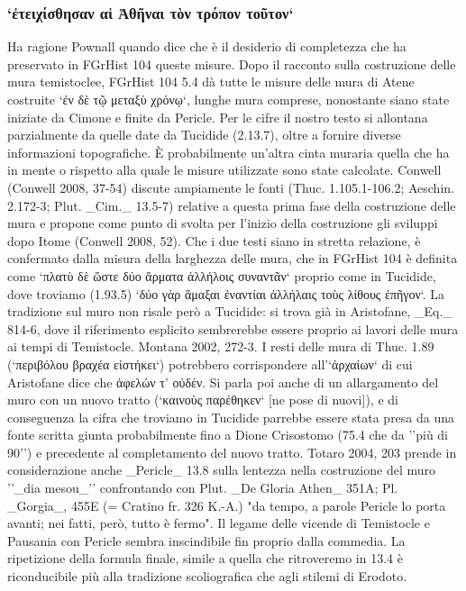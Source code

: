             \subsubsection{`ἐτειχίσθησαν αἱ Ἀθῆναι τὸν τρόπον τοῦτον`}
            Ha ragione Pownall quando dice che è il desiderio di completezza che ha preservato in FGrHist 104  queste misure. Dopo il racconto sulla costruzione delle mura temistoclee, FGrHist 104 5.4 dà tutte le misure delle mura di Atene costruite `ἐν δὲ τῷ μεταξὺ χρόνῳ`, lunghe mura comprese, nonostante siano state iniziate da  Cimone e finite da Pericle. Per le cifre il nostro testo si allontana parzialmente da quelle date da Tucidide (2.13.7), oltre a fornire diverse informazioni topografiche. È probabilmente un'altra cinta muraria quella che ha in mente o rispetto alla quale le misure utilizzate sono state calcolate. Conwell (Conwell 2008, 37-54) discute ampiamente le fonti (Thuc. 1.105.1-106.2; Aeschin. 2.172-3; Plut. _Cim._ 13.5-7) relative a questa prima fase della costruzione delle mura e propone come punto di svolta per l'inizio della costruzione gli sviluppi dopo Itome (Conwell 2008, 52). Che i due testi siano in stretta relazione, è confermato dalla misura della larghezza delle mura, che in FGrHist 104 è definita come `πλατὺ δὲ ὥστε δύο ἅρματα ἀλλήλοις συναντᾶν` proprio come in Tucidide, dove troviamo (1.93.5) `δύο γὰρ ἅμαξαι ἐναντίαι ἀλλήλαις τοὺς λίθους ἐπῆγον`. La tradizione sul muro non risale però a Tucidide: si trova già in Aristofane, _Eq._ 814-6, dove il riferimento esplicito sembrerebbe essere proprio ai lavori delle mura ai tempi di Temistocle. Montana 2002, 272-3. I resti delle mura di Thuc. 1.89 (`περιβόλου βραχέα εἱστήκει`) potrebbero corrispondere all'`ἀρχαίων` di cui Aristofane  dice che \textgreek{ἀφελών τ’ οὐδέν}. Si parla poi anche di un allargamento del muro con un nuovo tratto (`καινοὺς παρέθηκεν` [ne pose di nuovi]), e di conseguenza la cifra che troviamo in Tucidide parrebbe essere stata presa da una fonte scritta giunta probabilmente fino a Dione Crisostomo (75.4 che da ''più di 90'') e precedente al completamento del nuovo tratto. Totaro 2004, 203 prende in considerazione anche _Pericle_  13.8 sulla lentezza nella costruzione del muro ''_dia mesou_''  confrontando con Plut. _De Gloria Athen_ 351A; Pl. _Gorgia_, 455E (= Cratino fr. 326 K.-A.) "da tempo, a parole Pericle  lo porta avanti; nei fatti, però, tutto è fermo". Il legame delle vicende di Temistocle e Pausania  con Pericle  sembra inscindibile fin proprio dalla commedia. 
            La ripetizione della formula finale, simile a quella che ritroveremo in 13.4 è riconducibile più alla tradizione scoliografica che agli stilemi di Erodoto. 
